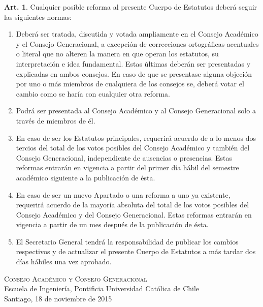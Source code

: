 \documentclass[letterpaper,11pt]{article}
\theoremstyle{definition}%
\newtheorem{art}{Art.} %
\begin{document}
\begin{art}\label{normaReforma}
	Cualquier posible reforma al presente Cuerpo de Estatutos deberá seguir las siguientes normas:
	\begin{enumerate}
		\item Deberá ser tratada, discutida y votada ampliamente en el Consejo Académico y el Consejo Generacional, a excepción de correcciones ortográficas acentuales o literal que no alteren la manera en que operan los estatutos, su interpretación e idea fundamental. Estas últimas deberán ser presentadas y explicadas en ambos consejos. En caso de que se presentase alguna objeción por uno o más miembros de cualquiera de los consejos se, deberá votar el cambio como se haría con cualquier otra reforma.

		\item  Podrá ser presentada al Consejo Académico y al Consejo Generacional solo a través de miembros de él.

		\item  En caso de ser los Estatutos principales, requerirá acuerdo de a lo menos dos tercios del total de los votos posibles del Consejo Académico y también del Consejo Generacional, independiente de ausencias o presencias. Estas reformas entrarán en vigencia a partir del primer día hábil del semestre académico siguiente a la publicación de ésta.

		\item  En caso de ser un nuevo Apartado o una reforma a uno ya existente, requerirá acuerdo de la mayoría absoluta del total de los votos posibles del Consejo Académico y del Consejo Generacional. Estas reformas entrarán en vigencia a partir de un mes después de la publicación de ésta.
		\item  El Secretario General tendrá la responsabilidad de publicar los cambios respectivos y de actualizar el presente Cuerpo de Estatutos a más tardar dos días hábiles una vez aprobado.
	\end{enumerate}
\end{art}

\vfill
\textsc{Consejo Académico y Consejo Generacional}\\
Escuela de Ingeniería, Pontificia Universidad Católica de Chile\\
Santiago, 18 de noviembre de 2015

\newpage
\end{document}
